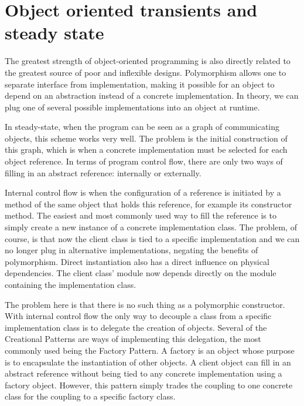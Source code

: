 \section{Object oriented transients and steady state}

The greatest strength of object-oriented programming is also directly related to the greatest source of poor and inflexible
designs. Polymorphism allows one to separate interface from implementation, making it possible for an object to depend
on an abstraction instead of a concrete implementation. In theory, we can plug one of several possible implementations
into an object at runtime. 

In steady-state, when the program can be seen as a graph of communicating objects, this scheme works very well. The
problem is the initial construction of this graph, which is when a concrete implementation must be selected for
each object reference. In terms of program control flow, there are only two ways of filling in an abstract reference:
internally or externally.

Internal control flow is when the configuration of a reference is initiated by a method of the same object that holds
this reference, for example its constructor method. The easiest and most commonly used way to fill the reference is
to simply create a new instance of a concrete implementation class. The problem, of course, is that now the client
class is tied to a specific implementation and we can no longer plug in alternative implementations, negating the
benefits of polymorphism. Direct instantiation also has a direct influence on physical dependencies. The client
class' module now depends directly on the module containing the implementation class.

The problem here is that there is no such thing as a polymorphic constructor. With internal control flow
the only way to decouple a class from a specific implementation class is to delegate the creation of objects.
Several of the Creational Patterns \cite{Gamma} are ways of implementing this delegation, the most commonly
used being the Factory Pattern. A factory is an object whose purpose is to encapsulate the instantiation of
other objects. A client object can fill in an abstract reference without being tied to any concrete implementation
using a factory object. However, this pattern simply trades the coupling to one concrete class for the coupling to
a specific factory class.

